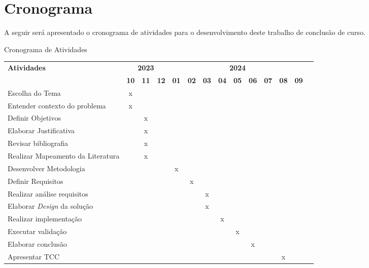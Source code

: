 

% 

% 







\textual









\chapter{Cronograma}
\label{cap:cronograma}
A seguir será apresentado o cronograma de atividades para o desenvolvimento deste trabalho de conclusão de curso.
\begin{quadro}[H]
    \centering
    \caption{Cronograma de Atividades}
    \begin{tabular}{|p{3.5cm}|c|c|c|c|c|c|c|c|c|c|c|c|c|}
        \hline
        \multirow{2}{*}{\textbf{Atividades}} & \multicolumn{3}{c|}{\textbf{2023}} & \multicolumn{9}{c|}{\textbf{2024}} \\ \cline{2-13}
        & \textbf{10} & \textbf{11} & \textbf{12} & \textbf{01} & \textbf{02} & \textbf{03} & \textbf{04} & \textbf{05} & \textbf{06} & \textbf{07} & \textbf{08}& \textbf{09} \\ \hline
        Escolha do Tema & x & & & & & & & & & & & \\ \hline
        Entender contexto do problema & x & & & & & & & & & & & \\ \hline
        Definir Objetivos & & x & & & & & & & & & & \\ \hline
        Elaborar Justificativa & & x & & & & & & & & & & \\ \hline
        Revisar bibliografia & & x & & & & & & & & & & \\ \hline
        Realizar Mapeamento da Literatura & & x & & & & & & & & & & \\ \hline
        Desenvolver Metodologia & & & & x & & & & & & & & \\ \hline
        Definir Requisitos & & & & & x & & & & & & & \\ \hline
        Realizar análise requisitos & & & & & & x & & & & & & \\ \hline
        Elaborar \textit{Design} da solução & & & & & & x & & & & & & \\ \hline
        Realizar implementação & & & & & & & x & & & & & \\ \hline
        Executar validação & & & & & & & & x & & & & \\ \hline
        Elaborar conclusão & & & & & & & & & x & & & \\ \hline
        Apresentar TCC & & & & & & & & & & & x & \\ \hline
      \end{tabular}
    \label{quad:cronograma}
\end{quadro}
